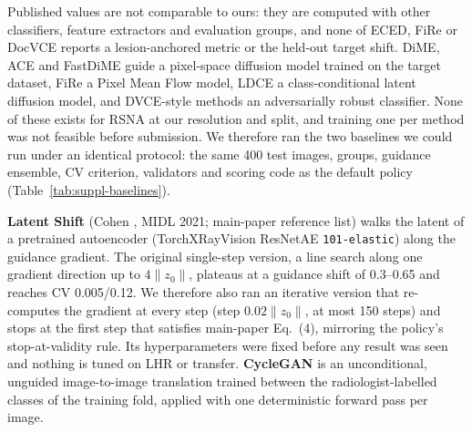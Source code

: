 Published values are not comparable to ours: they are computed with other classifiers, feature extractors and evaluation groups, and none of ECED, FiRe or DocVCE reports a lesion-anchored metric or the held-out target shift. DiME, ACE and FastDiME guide a pixel-space diffusion model trained on the target dataset, FiRe a Pixel Mean Flow model, LDCE a class-conditional latent diffusion model, and DVCE-style methods an adversarially robust classifier. None of these exists for RSNA at our resolution and split, and training one per method was not feasible before submission. We therefore ran the two baselines we could run under an identical protocol: the same 400 test images, groups, guidance ensemble, CV criterion, validators and scoring code as the default policy (Table~\ref{tab:suppl-baselines}).

\textbf{Latent Shift} (Cohen \etal, MIDL 2021; main-paper reference list) walks the latent of a pretrained autoencoder (TorchXRayVision ResNetAE \texttt{101-elastic}) along the guidance gradient. The original single-step version, a line search along one gradient direction up to $4\|z_0\|$, plateaus at a guidance shift of 0.3--0.65 and reaches CV 0.005/0.12. We therefore also ran an iterative version that re-computes the gradient at every step (step $0.02\|z_0\|$, at most 150 steps) and stops at the first step that satisfies main-paper Eq.~(4), mirroring the policy's stop-at-validity rule. Its hyperparameters were fixed before any result was seen and nothing is tuned on LHR or transfer. \textbf{CycleGAN} is an unconditional, unguided image-to-image translation trained between the radiologist-labelled classes of the training fold, applied with one deterministic forward pass per image.

